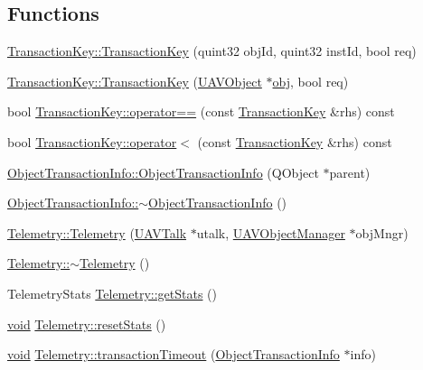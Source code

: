 \subsection*{Functions}
\begin{DoxyCompactItemize}
\item 
\hyperlink{group___u_a_v_talk_plugin_gad570ba59a89b2499d1fa950f756f029e}{Transaction\-Key\-::\-Transaction\-Key} (quint32 obj\-Id, quint32 inst\-Id, bool req)
\item 
\hyperlink{group___u_a_v_talk_plugin_ga01b3c8039cd97c7da26eb79fdeed0003}{Transaction\-Key\-::\-Transaction\-Key} (\hyperlink{class_u_a_v_object}{U\-A\-V\-Object} $\ast$\hyperlink{glext_8h_a0c0d4701a6c89f4f7f0640715d27ab26}{obj}, bool req)
\item 
bool \hyperlink{group___u_a_v_talk_plugin_ga6619fa90d68b631eef2b94302d77df19}{Transaction\-Key\-::operator==} (const \hyperlink{class_transaction_key}{Transaction\-Key} \&rhs) const 
\item 
bool \hyperlink{group___u_a_v_talk_plugin_ga535141f4efa21d7b4b5d5314c92d1c8e}{Transaction\-Key\-::operator$<$} (const \hyperlink{class_transaction_key}{Transaction\-Key} \&rhs) const 
\item 
\hyperlink{group___u_a_v_talk_plugin_ga56a113c31769c8841a65cf085c53a33e}{Object\-Transaction\-Info\-::\-Object\-Transaction\-Info} (Q\-Object $\ast$parent)
\item 
\hyperlink{group___u_a_v_talk_plugin_ga8b1a7a6e63feac107ca370ce1a68758f}{Object\-Transaction\-Info\-::$\sim$\-Object\-Transaction\-Info} ()
\item 
\hyperlink{group___u_a_v_talk_plugin_ga6998be3c493d7a742d8f54bcf235e823}{Telemetry\-::\-Telemetry} (\hyperlink{class_u_a_v_talk}{U\-A\-V\-Talk} $\ast$utalk, \hyperlink{class_u_a_v_object_manager}{U\-A\-V\-Object\-Manager} $\ast$obj\-Mngr)
\item 
\hyperlink{group___u_a_v_talk_plugin_ga5d74297211be2d8d48f38e2632c97de8}{Telemetry\-::$\sim$\-Telemetry} ()
\item 
Telemetry\-Stats \hyperlink{group___u_a_v_talk_plugin_ga9f456df92180138a0adebc5e3afc3402}{Telemetry\-::get\-Stats} ()
\item 
\hyperlink{group___u_a_v_objects_plugin_ga444cf2ff3f0ecbe028adce838d373f5c}{void} \hyperlink{group___u_a_v_talk_plugin_ga6452c56eab6e4b7ce913566562a005ef}{Telemetry\-::reset\-Stats} ()
\item 
\hyperlink{group___u_a_v_objects_plugin_ga444cf2ff3f0ecbe028adce838d373f5c}{void} \hyperlink{group___u_a_v_talk_plugin_gab5d172ba63e07316e086a65c5bcc8d47}{Telemetry\-::transaction\-Timeout} (\hyperlink{class_object_transaction_info}{Object\-Transaction\-Info} $\ast$info)

\end{DoxyCompactItemize}
